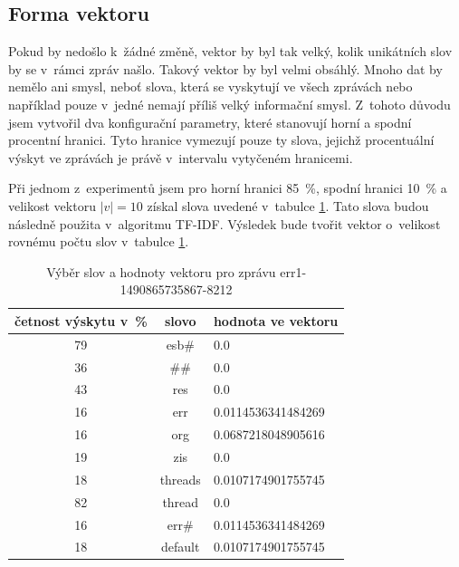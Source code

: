 \documentclass[thesis=M,czech]{FITthesis}[2012/10/20]
\begin{document}
		\subsection{Forma vektoru}
		Pokud by nedošlo k~žádné změně, vektor by byl tak velký, kolik unikátních slov by se v~rámci zpráv našlo. Takový vektor by byl velmi obsáhlý. Mnoho dat by nemělo ani smysl, neboť slova, která se vyskytují ve všech zprávách nebo například pouze v~jedné nemají příliš velký informační smysl. Z~tohoto důvodu jsem vytvořil dva konfigurační parametry, které stanovují horní a spodní procentní hranici. Tyto hranice vymezují pouze ty slova, jejichž procentuální výskyt ve zprávách je právě v~intervalu vytyčeném hranicemi.  
		
		Při jednom z~experimentů jsem pro horní hranici 85~\%, spodní hranici 10~\%  a velikost vektoru $|v| = 10$ získal slova uvedené v~tabulce \ref{tab:vector-err}. Tato slova budou následně použita v~algoritmu TF-IDF. Výsledek bude tvořit vektor o~velikost rovnému počtu slov v~tabulce \ref{tab:vector-err}.
		
		\begin{table}[htb]\centering
			\centering
			\caption{Výběr slov a hodnoty vektoru pro zprávu err1-1490865735867-8212}
			\label{tab:vector-err}
			\begin{tabular}{|c|c|l|}
				\hline
				\textbf{četnost výskytu v~\%} & \textbf{slovo} & \multicolumn{1}{c|}{\textbf{hodnota ve vektoru}} \\ \hline
				79                            & esb\#          & 0.0                                                               \\ \hline
				36                            & \#\#           & 0.0                                                               \\ \hline
				43                            & res            & 0.0                                                               \\ \hline
				16                            & err            & 0.0114536341484269                                                \\ \hline
				16                            & org            & 0.0687218048905616                                                \\ \hline
				19                            & zis            & 0.0                                                               \\ \hline
				18                            & threads        & 0.0107174901755745                                                \\ \hline
				82                            & thread         & 0.0                                                               \\ \hline
				16                            & err\#          & 0.0114536341484269                                                \\ \hline
				18                            & default        & 0.0107174901755745                                                \\ \hline
			\end{tabular}
		\end{table}
		
\end{document}

